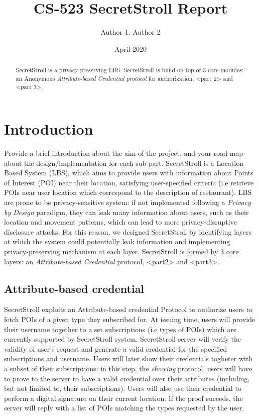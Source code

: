 \documentclass[10pt,conference,compsocconf]{IEEEtran}
\title{CS-523 SecretStroll Report}
\author{Author 1, Author 2}
\date{April 2020}
\begin{document}
\maketitle

\begin{abstract}
    SecretStroll is a privacy preserving LBS. SecretStroll is build on top of 3 core modules: an Anonymous
    \textit{Attribute-based Credential protocol} for authorization, <part 2> and <part 3>.
\end{abstract}

\section{Introduction}

Provide a brief introduction about the aim of the project, and your road-map about the design/implementation for each sub-part.
SecretStroll is a Location Based System (LBS), which aims to provide users with information about Points of Interest (POI)
near their location, satisfying user-specified criteria (i.e retrieve POIs near user location which correspond to the description
of restaurant).\newline
LBS are prone to be privacy-sensitive system: if not implemented following a \textit{Privacy by Design} paradigm, they can leak
many information about users, such as their location and movement patterns, which can lead to more privacy-disruptive disclosure attacks.
For this reason, we designed SecretStroll by identifying layers at which the system could potentially leak information and implementing
privacy-preserving mechanism at each layer.\newline
SecretStroll is formed by 3 core layers: an \textit{Attribute-based Credential} protocol, <part2> and <part3>.
\subsection{Attribute-based credential}
SecretStroll exploits an Attribute-based credential Protocol to authorize users to fetch POIs of a given type they subscribed for.
At issuing time, users will provide their username together to a set subscriptions (i.e types of POIs) which are currently supported
by SecretStroll system. SecretStroll server will verify the validity of user's request and generate a valid credential for the specified
subscriptions and username. Users will later show their credentials togheter with a subset of their subscriptions: in this step,
the \textit{showing} protocol, users will have to prove to the server to have a valid credential over their attributes
(including, but not limited to, their subscriptions). Users will also use their credential to perform a digital signature
on their current location. If the proof suceeds, the server will reply with a list of POIs matching the types requested by the user.
\end{document}
